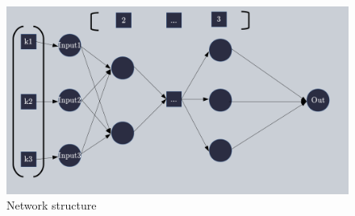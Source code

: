 \documentclass[10pt,a4paper,oneside]{article}
\begin{document}
\vspace{0.8cm}

\begin{figure}[!h]
\centering
\includegraphics[scale=0.35]{./images/reseau.png}
\caption{Network structure}
\label{reseau}
\end{figure}

\vspace{0.8cm}
\end{document}
